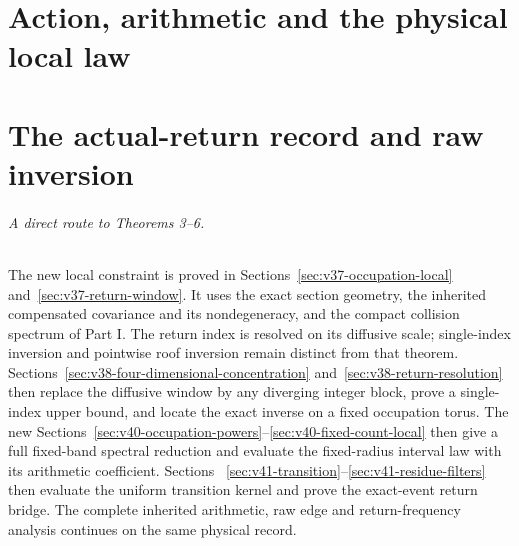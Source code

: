 \documentclass[11pt,reqno]{amsart}
\numberwithin{equation}{section}
\theoremstyle{definition}\newtheorem{definition}[theorem]{Definition}
\theoremstyle{remark}\newtheorem{remark}[theorem]{Remark}
\begin{document}
\part{Action, arithmetic and the physical local law}









\part{The actual-return record and raw inversion}
\paragraph{A direct route to Theorems 3--6.}
The new local constraint is proved in
Sections~\ref{sec:v37-occupation-local} and~\ref{sec:v37-return-window}.
It uses the exact section geometry, the inherited compensated
covariance and its nondegeneracy, and the compact collision spectrum
of Part I. The return index is resolved on its diffusive scale;
single-index inversion and pointwise roof inversion remain distinct
from that theorem. Sections~\ref{sec:v38-four-dimensional-concentration}
and~\ref{sec:v38-return-resolution} then replace the diffusive window
by any diverging integer block, prove a single-index upper bound, and
locate the exact inverse on a fixed occupation torus. The new
Sections~\ref{sec:v40-occupation-powers}--\ref{sec:v40-fixed-count-local}
then give a full fixed-band spectral reduction and evaluate the
fixed-radius interval law with its arithmetic coefficient. Sections~
\ref{sec:v41-transition}--\ref{sec:v41-residue-filters} then evaluate
the uniform transition kernel and prove the exact-event return bridge. The
complete inherited arithmetic, raw edge and return-frequency analysis
continues on the same physical record.

















\end{document}
